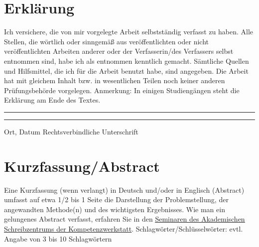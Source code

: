 \documentclass[a4paper,11pt]{article}%
\renewcommand{\\}{\vspace*{0.5\baselineskip} \newline}
\begin{document}
\section*{Erklärung}
Ich versichere, die von mir vorgelegte Arbeit selbstständig verfasst zu haben. Alle Stellen, die wörtlich oder sinngemäß aus veröffentlichten oder nicht veröffentlichten Arbeiten anderer oder der Verfasserin/des Verfassers selbst entnommen sind, habe ich als entnommen kenntlich gemacht. Sämtliche Quellen und Hilfsmittel, die ich für die Arbeit benutzt habe, sind angegeben. Die Arbeit hat mit gleichem Inhalt bzw. in wesentlichen Teilen noch keiner anderen Prüfungsbehörde vorgelegen.\\
Anmerkung: In einigen Studiengängen steht die Erklärung am Ende des Textes.\\
~\\
~\\
\rule{0.35\textwidth}{0.4pt} \hspace*{3cm} \rule{0.45\textwidth}{0.4pt} \newline
Ort, Datum	\hspace*{6.3cm}	Rechtsverbindliche Unterschrift
\newpage
\section*{Kurzfassung/Abstract}
Eine Kurzfassung (wenn verlangt) in Deutsch und/oder in Englisch (Abstract) umfasst auf etwa 1/2 bis 1 Seite die Darstellung der Problemstellung, der angewandten Methode(n) und des wichtigsten Ergebnisses.\\
Wie man ein gelungenes Abstract verfasst, erfahren Sie in den \href{https://www.th-koeln.de/studium/schluesselkompetenzen_25490.php}{\underline{Seminaren des Akademischen} \underline{Schreibzentrums der Kompetenzwerkstatt}}.\\
Schlagwörter/Schlüsselwörter: evtl. Angabe von 3 bis 10 Schlagwörtern 
\newpage
\tableofcontents
\newpage
{}








\newpage
\end{document}
